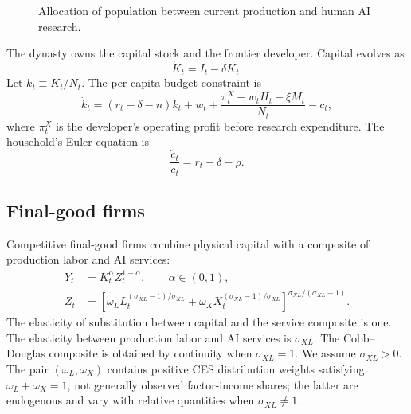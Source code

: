 \begin{figure}[H]
    \centering
    \caption{Allocation of population between current production and human AI
    research.}
    \label{fig:labor-allocation-flow}
\end{figure}

The dynasty owns the capital stock and the frontier developer. Capital evolves as
\begin{equation}
    \dot K_t=I_t-\delta K_t.
    \label{eq:capital-law}
\end{equation}
Let $k_t\equiv K_t/N_t$. The per-capita budget constraint is
\begin{equation}
    \dot k_t
    =
    (r_t-\delta-n)k_t+w_t
    +\frac{\pi^X_t-w_tH_t-\xi M_t}{N_t}
    -c_t,
    \label{eq:household-budget}
\end{equation}
where $\pi^X_t$ is the developer's operating profit before research expenditure.
The household's Euler equation is
\begin{equation}
    \frac{\dot c_t}{c_t}=r_t-\delta-\rho.
    \label{eq:euler}
\end{equation}

\subsection{Final-good firms}

Competitive final-good firms combine physical capital with a composite of production
labor and AI services:
\begin{align}
    Y_t
    &=
    K_t^\alpha Z_t^{1-\alpha},
    \qquad \alpha\in(0,1),
    \label{eq:final-production}\\
    Z_t
    &=
    \left[
        \omega_L L_t^{(\sigma_{XL}-1)/\sigma_{XL}}
        +\omega_X X_t^{(\sigma_{XL}-1)/\sigma_{XL}}
    \right]^{\sigma_{XL}/(\sigma_{XL}-1)}.
    \label{eq:service-composite}
\end{align}
The elasticity of substitution between capital and the service composite is one.
The elasticity between production labor and AI services is $\sigma_{XL}$. The
Cobb--Douglas composite is obtained by continuity when $\sigma_{XL}=1$. We assume
$\sigma_{XL}>0$. The pair $(\omega_L,\omega_X)$ contains positive CES distribution
weights satisfying $\omega_L+\omega_X=1$, not generally observed factor-income
shares; the latter are endogenous and vary with relative quantities when
$\sigma_{XL}\neq1$.

